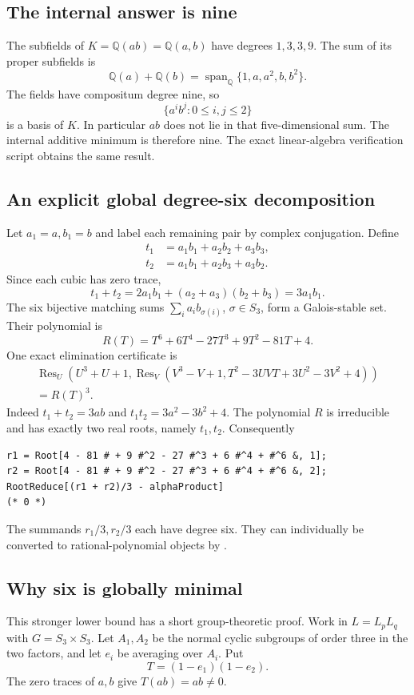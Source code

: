 \documentclass[11pt]{article}
\newcommand{\Q}{\mathbb Q}
\newcommand{\Res}{\operatorname{Res}}
\newcommand{\Span}{\operatorname{span}_{\Q}}
\newcommand{\code}[1]{\texttt{\detokenize{#1}}}
\theoremstyle{definition}\newtheorem{definition}[theorem]{Definition}
\theoremstyle{remark}\newtheorem{remark}[theorem]{Remark}
\begin{document}
\subsection{The internal answer is nine}
The subfields of $K=\Q(ab)=\Q(a,b)$ have degrees $1,3,3,9$.
The sum of its proper subfields is
\[
 \Q(a)+\Q(b)=\Span\{1,a,a^2,b,b^2\}.
\]
The fields have compositum degree nine, so
\[
 \{a^i b^j:0\le i,j\le2\}
\]
is a basis of $K$. In particular $ab$ does not lie in that five-dimensional
sum. The internal additive minimum is therefore nine. The exact linear-algebra
verification script obtains the same result.

\subsection{An explicit global degree-six decomposition}
Let $a_1=a,b_1=b$ and label each remaining pair by complex conjugation.
Define
\begin{align*}
 t_1&=a_1b_1+a_2b_2+a_3b_3,\\
 t_2&=a_1b_1+a_2b_3+a_3b_2.
\end{align*}
Since each cubic has zero trace,
\[
 t_1+t_2=2a_1b_1+(a_2+a_3)(b_2+b_3)=3a_1b_1.
\]
The six bijective matching sums
$\sum_i a_i b_{\sigma(i)}$, $\sigma\in S_3$, form a Galois-stable set.
Their polynomial is
\[
 R(T)=T^6+6T^4-27T^3+9T^2-81T+4.
\]
One exact elimination certificate is
\begin{multline}
 \Res_U\!\left(U^3+U+1,
  \Res_V\!\left(V^3-V+1,
    T^2-3UVT+3U^2-3V^2+4\right)\right)\\
 =R(T)^3.
\end{multline}
Indeed $t_1+t_2=3ab$ and $t_1t_2=3a^2-3b^2+4$.
The polynomial $R$ is irreducible and has exactly two real roots, namely
$t_1,t_2$. Consequently
\begin{lstlisting}
r1 = Root[4 - 81 # + 9 #^2 - 27 #^3 + 6 #^4 + #^6 &, 1];
r2 = Root[4 - 81 # + 9 #^2 - 27 #^3 + 6 #^4 + #^6 &, 2];
RootReduce[(r1 + r2)/3 - alphaProduct]
(* 0 *)
\end{lstlisting}
The summands $r_1/3,r_2/3$ each have degree six. They can individually be
converted to rational-polynomial \code{Root} objects by \code{RootReduce}.

\subsection{Why six is globally minimal}
This stronger lower bound has a short group-theoretic proof.
Work in $L=L_pL_q$ with $G=S_3\times S_3$.
Let $A_1,A_2$ be the normal cyclic subgroups of order three in the two factors,
and let $e_i$ be averaging over $A_i$. Put
\[
 T=(1-e_1)(1-e_2).
\]
The zero traces of $a,b$ give $T(ab)=ab\ne0$.
\end{document}
